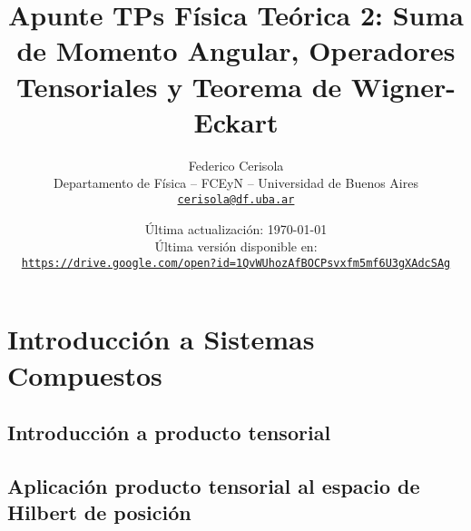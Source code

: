 \documentclass[10pt, a4paper]{article}
\numberwithin{equation}{subsection}
\begin{document}
\title{Apunte TPs Física Teórica 2: Suma de Momento Angular, Operadores
  Tensoriales y Teorema de Wigner-Eckart}
\author{Federico Cerisola
  \\ \small{Departamento de Física -- FCEyN -- Universidad de Buenos Aires}
  \\ \small{\href{mailto:cerisola@df.uba.ar}{\nolinkurl{cerisola@df.uba.ar}}}
}
\date{\small Última actualización: \today \\[1em]
  Última versión disponible en: \\
  \texttt{
    \href{https://drive.google.com/open?id=1QvWUhozAfBOCPsvxfm5mf6U3gXAdcSAg}
    {https://drive.google.com/open?id=1QvWUhozAfBOCPsvxfm5mf6U3gXAdcSAg}
  }}
\maketitle
\thispagestyle{empty}

\vfill
\doclicenseThis

\pagebreak

\newpage
  \tableofcontents
\newpage

\section{Introducción a Sistemas Compuestos}


\subsection{Introducción a producto tensorial}


\subsection{Aplicación producto tensorial al espacio de Hilbert de posición}

\end{document}

